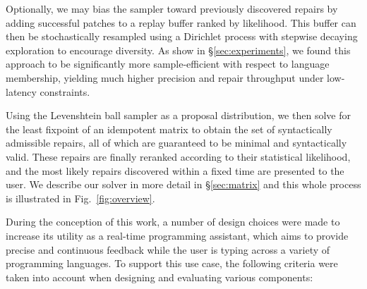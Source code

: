 \documentclass[sigplan,review,anonymous,acmsmall]{acmart}\settopmatter{printfolios=false,printccs=false,printacmref=false}
\begin{document}
Optionally, we may bias the sampler toward previously discovered repairs by adding successful patches to a replay buffer ranked by likelihood. This buffer can then be stochastically resampled using a Dirichlet process with stepwise decaying exploration to encourage diversity. As show in \S\ref{sec:experiments}, we found this approach to be significantly more sample-efficient with respect to language membership, yielding much higher precision and repair throughput under low-latency constraints.

Using the Levenshtein ball sampler as a proposal distribution, we then solve for the least fixpoint of an idempotent matrix to obtain the set of syntactically admissible repairs, all of which are guaranteed to be minimal and syntactically valid. These repairs are finally reranked according to their statistical likelihood, and the most likely repairs discovered within a fixed time are presented to the user. We describe our solver in more detail in \S\ref{sec:matrix} and this whole process is illustrated in Fig.~\ref{fig:overview}.

During the conception of this work, a number of design choices were made to increase its utility as a real-time programming assistant, which aims to provide precise and continuous feedback while the user is typing across a variety of programming languages. To support this use case, the following criteria were taken into account when designing and evaluating various components:
\end{document}
